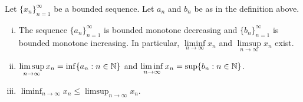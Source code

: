 \begin{prop}
Let $\{ x_n \}_{n=1}^\infty$ be a bounded sequence.  Let $a_n$ and $b_n$ be as in
the definition above.
\begin{enumerate}[(i)]
\item
The
sequence $\{ a_n \}_{n=1}^\infty$ is bounded monotone decreasing
and $\{ b_n \}_{n=1}^\infty$ is bounded monotone increasing.  In particular,
$\liminf\limits_{n\to\infty} x_n$ and $\limsup\limits_{n\to\infty} x_n$ exist.
\item
$\displaystyle \limsup_{n \to \infty} x_n = \inf \{ a_n : n \in {\mathbb{N}} \}$
and
$\displaystyle \liminf_{n \to \infty} x_n = \sup \{ b_n : n \in {\mathbb{N}} \}$.
\item
$\displaystyle \liminf_{n \to \infty} x_n \leq \limsup_{n \to \infty} x_n$.
\end{enumerate}
\end{prop}

